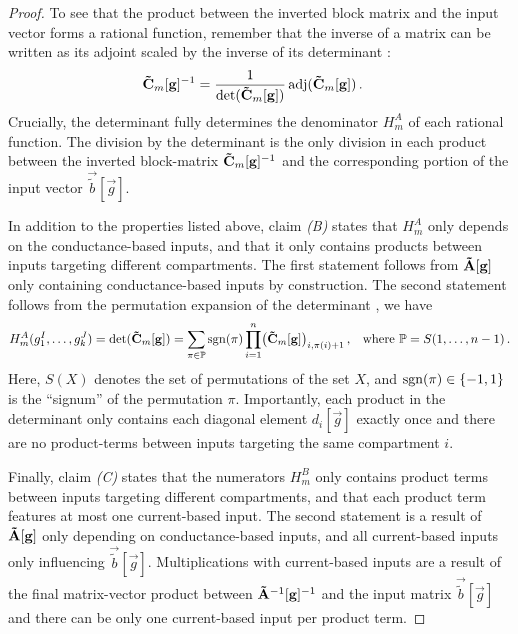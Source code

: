 \begin{proof}
To see that the product between the inverted block matrix and the input vector forms a rational function, remember that the inverse of a matrix can be written as its adjoint scaled by the inverse of its determinant \citep[e.g.,][Theorem~1.9, p.~366]{hefferon2020linear}:
\begin{align*}
	\mathbf{\tilde C}_m[\mathbf{g}]^{-1} &= \frac{1}{\det(\mathbf{\tilde C}_m[\mathbf{g}])} \operatorname{\mathrm{adj}}(\mathbf{\tilde C}_m[\mathbf{g}]) \,.
\end{align*}
Crucially, the determinant fully determines the denominator $H^A_m$ of each rational function.
The division by the determinant is the only division in each product between the inverted block-matrix $\mathbf{\tilde C}_m[\mathbf{g}]^{-1}$ and the corresponding portion of the input vector $\vec{\tilde b}[\vec g]$.

In addition to the properties listed above, claim \emph{(B)} states that $H^A_m$ only depends on the conductance-based inputs, and that it only contains products between inputs targeting different compartments.
The first statement follows from $\mathbf{\tilde A}[\mathbf{g}]$ only containing conductance-based inputs by construction.
The second statement follows from the permutation expansion of the determinant \citep[e.g.,][Section~4.I.3, p.~337]{hefferon2020linear}, we have
\begin{align*}
	H^A_m(g_1^I, \ldots, g_k^J) = \det( \mathbf{\tilde C}_m[\mathbf{g}] )
		&= \sum_{\pi \in \mathbb{P}} \operatorname{\mathrm{sgn}}(\pi) \prod_{i=1}^n \bigl(\mathbf{\tilde C}_m[\mathbf{g}]\bigr)_{i, \pi(i) + 1} \,,
	& \text{where } \mathbb{P} = S({1, \ldots, n - 1}) \,.
\end{align*}
Here, $S(X)$ denotes the set of permutations of the set $X$, and $\operatorname{\mathrm{sgn}}(\pi) \in \{-1, 1\}$ is the \enquote{signum} of the permutation $\pi$.
Importantly, each product in the determinant only contains each diagonal element $d_i[\vec g]$ exactly once and there are no product-terms between inputs targeting the same compartment $i$.

Finally, claim \emph{(C)} states that the numerators $H_m^B$ only contains product terms between inputs targeting different compartments, and that each product term features at most one current-based input.
The second statement is a result of $\mathbf{\tilde A}[\mathbf{g}]$ only depending on conductance-based inputs, and all current-based inputs only influencing $\vec{\tilde b}[\vec g]$.
Multiplications with current-based inputs are a result of the final matrix-vector product between $\mathbf{\tilde A}^{-1}[\mathbf{g}]^{-1}$ and the input matrix $\vec{\tilde b}[\vec g]$ and there can be only one current-based input per product term.


\end{proof}
